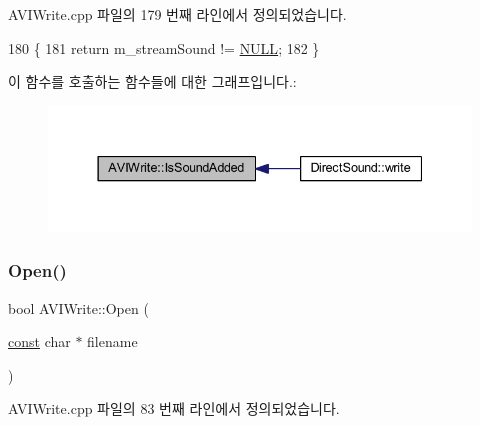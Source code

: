A\+V\+I\+Write.\+cpp 파일의 179 번째 라인에서 정의되었습니다.


\begin{DoxyCode}
180 \{
181   \textcolor{keywordflow}{return} m\_streamSound != \mbox{\hyperlink{getopt1_8c_a070d2ce7b6bb7e5c05602aa8c308d0c4}{NULL}};
182 \}
\end{DoxyCode}
이 함수를 호출하는 함수들에 대한 그래프입니다.\+:
\nopagebreak
\begin{figure}[H]
\begin{center}
\leavevmode
\includegraphics[width=337pt]{class_a_v_i_write_a7e14c1640c3c888c2b0a0b042c0d5b8f_icgraph}
\end{center}
\end{figure}
\mbox{\label{class_a_v_i_write_a2b4ef2aeeef846bcb12ef58189043eb1}} 
\subsubsection{\texorpdfstring{Open()}{Open()}}
{\footnotesize\ttfamily bool A\+V\+I\+Write\+::\+Open (\begin{DoxyParamCaption}\item[{\mbox{\hyperlink{getopt1_8c_a2c212835823e3c54a8ab6d95c652660e}{const}} char $\ast$}]{filename }\end{DoxyParamCaption})}



A\+V\+I\+Write.\+cpp 파일의 83 번째 라인에서 정의되었습니다.


